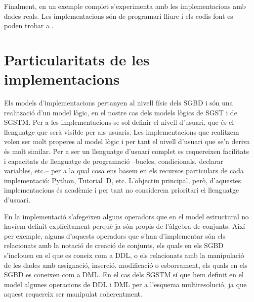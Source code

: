 Finalment, en un exemple complet s'experimenta amb les implementacions
amb dades reals. Les implementacions són de programari lliure i els
codis font es poden trobar a \cite{llusa:implementacions}.










\section{Particularitats de les implementacions}



Els models d'implementacions pertanyen al nivell físic dels \gls{SGBD}
i són una realització d'un model lògic, en el nostre cas dels models
lògics de \gls{SGST} i de \gls{SGSTM}. Per a les implementacions se
sol definir el nivell d'usuari, que és el llenguatge que serà visible
per als usuaris. Les implementacions que realitzem volen ser molt
properes al model lògic i per tant el nivell d'usuari que se'n deriva
és molt similar. Per a ser un llenguatge d'usuari complet es
requereixen facilitats i capacitats de llenguatge de programació
--bucles, condicionals, declarar variables, etc.-- per a la qual
cosa ens basem en els recursos particulars de cada implementació:
Python, Tutorial~D, etc. L'objectiu principal, però, d'aquestes
implementacions és acadèmic i per tant no considerem prioritari el
llenguatge d'usuari.




En la implementació s'afegeixen alguns operadors que en el model
estructural no havíem definit explícitament perquè ja són propis de
l'àlgebra de conjunts. Així per exemple, alguns d'aquests operadors
que s'han d'implementar són els relacionats amb la notació de creació
de conjunts, %
els quals en els \gls{SGBD} s'inclouen en el que es coneix com a
\gls{DDL}, o els relacionats amb la manipulació de les dades amb
assignació, inserció, modificació o esborrament, els quals en els
\gls{SGBD} es coneixen com a \gls{DML}.  En el cas dels \gls{SGSTM} sí
que hem definit en el model algunes operacions de \gls{DDL} i \gls{DML} per a
l'esquema multiresolució, ja que aquest requereix ser manipulat
coherentment.






